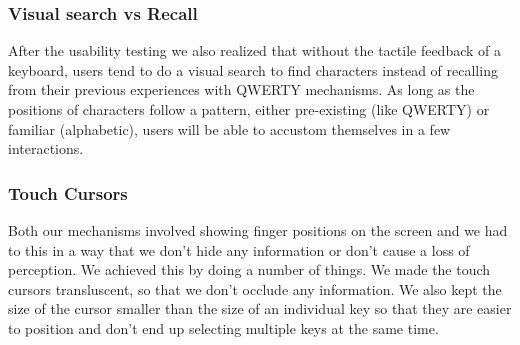 \subsubsection{Visual search vs Recall}

After the usability testing we also realized that without the tactile feedback of a keyboard, users tend to do a visual search to find characters instead of recalling from their previous experiences with QWERTY mechanisms. As long as the positions of characters follow a pattern, either pre-existing
(like QWERTY) or familiar (alphabetic), users will be able to accustom themselves in a few interactions.

\subsubsection{Touch Cursors}

Both our mechanisms involved showing finger positions on the screen and we had to this in a way that we don't hide any information or don't cause a loss of perception. We achieved this by doing a number of things. We made the touch cursors transluscent, so that we don't occlude any information. We also kept the size of the cursor smaller than the size of an individual key so that they are easier to position and don't end up selecting multiple keys at the same time.
